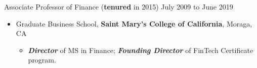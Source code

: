 \documentclass[11pt]{article}
\newenvironment{innerlist}[1][\enskip\textbullet]%
        {\begin{itemize}[#1,leftmargin=*,parsep=0pt,itemsep=0pt,topsep=0pt,partopsep=0pt]}
        {\end{itemize}}
\begin{document}
Associate Professor of Finance (\textbf{tenured} in 2015) \hfill {July 2009 to June 2019}
\begin{innerlist}
	\item[] Graduate Business School, \textbf{Saint Mary's College of California}, Moraga, CA
	\begin{innerlist}
		\item \textit{\textbf{Director}} of MS in Finance; \textit{\textbf{Founding Director}} of FinTech Certificate program.
	\end{innerlist}
\end{innerlist}

\vspace{2pt}		
\end{document}
